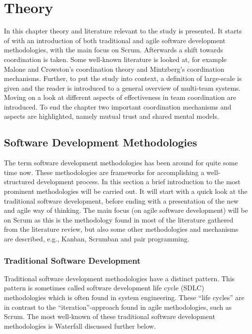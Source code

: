 \chapter{Theory}
\label{theory}

\minitoc

In this chapter theory and literature relevant to the study is presented. It starts of with an introduction of both traditional and agile software development methodologies, with the main focus on Scrum. Afterwards a shift towards coordination is taken. Some well-known literature is looked at, for example Malone and Crowston's coordination theory and Mintzberg's coordination mechanisms. Further, to put the study into context, a definition of large-scale is given and the reader is introduced to a general overview of multi-team systems. Moving on a look at different aspects of effectiveness in team coordination are introduced. To end the chapter two important coordination mechanisms and aspects are highlighted, namely mutual trust and shared mental models.

\newpage

\section{Software Development Methodologies}

The term software development methodologies has been around for quite some time now. These methodologies are frameworks for accomplishing a well-structured development process. In this section a brief introduction to the most prominent methodologies will be carried out. It will start with a quick look at the traditional software development, before ending with a presentation of the new and agile way of thinking. The main focus (on agile software development) will be on Scrum as this is the methodology found in most of the literature gathered from the literature review, but also some other methodologies and mechanisms are described, e.g., Kanban, Scrumban and pair programming.

\subsection{Traditional Software Development}

Traditional software development methodologies have a distinct pattern. This pattern is sometimes called software development life cycle (SDLC) methodologies which is often found in system engineering. These ``life cycles'' are in contrast to the ``iteration''-approach found in agile methodologies, such as Scrum. The most well-known of these traditional software development methodologies is Waterfall discussed further below.

